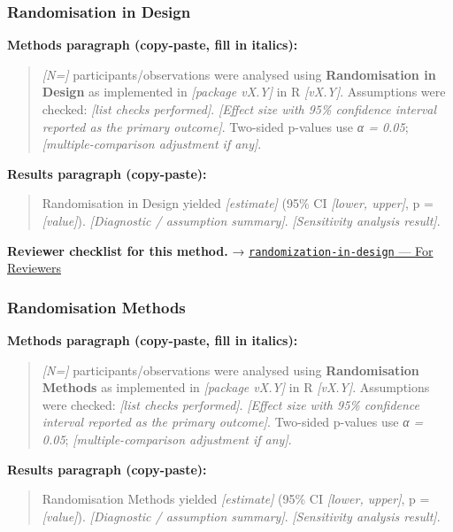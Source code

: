 \documentclass[
]{article}
\begin{document}
\subsubsection{Randomisation in Design}\label{randomisation-in-design}

\textbf{Methods paragraph (copy-paste, fill in italics):}

\begin{quote}
\emph{{[}N={]}} participants/observations were analysed using
\textbf{Randomisation in Design} as implemented in \emph{{[}package
vX.Y{]}} in R \emph{{[}vX.Y{]}}. Assumptions were checked: \emph{{[}list
checks performed{]}}. \emph{{[}Effect size with 95\% confidence interval
reported as the primary outcome{]}}. Two-sided p-values use \emph{α =
0.05}; \emph{{[}multiple-comparison adjustment if any{]}}.
\end{quote}

\textbf{Results paragraph (copy-paste):}

\begin{quote}
Randomisation in Design yielded \emph{{[}estimate{]}} (95\% CI
\emph{{[}lower, upper{]}}, p = \emph{{[}value{]}}). \emph{{[}Diagnostic
/ assumption summary{]}}. \emph{{[}Sensitivity analysis result{]}}.
\end{quote}

\textbf{Reviewer checklist for this method.} →
\href{../chapters/16-design/randomization-in-design.Rmd\#for-reviewers}{\texttt{randomization-in-design}
--- For Reviewers}

\subsubsection{Randomisation Methods}\label{randomisation-methods}

\textbf{Methods paragraph (copy-paste, fill in italics):}

\begin{quote}
\emph{{[}N={]}} participants/observations were analysed using
\textbf{Randomisation Methods} as implemented in \emph{{[}package
vX.Y{]}} in R \emph{{[}vX.Y{]}}. Assumptions were checked: \emph{{[}list
checks performed{]}}. \emph{{[}Effect size with 95\% confidence interval
reported as the primary outcome{]}}. Two-sided p-values use \emph{α =
0.05}; \emph{{[}multiple-comparison adjustment if any{]}}.
\end{quote}

\textbf{Results paragraph (copy-paste):}

\begin{quote}
Randomisation Methods yielded \emph{{[}estimate{]}} (95\% CI
\emph{{[}lower, upper{]}}, p = \emph{{[}value{]}}). \emph{{[}Diagnostic
/ assumption summary{]}}. \emph{{[}Sensitivity analysis result{]}}.
\end{quote}
\end{document}
